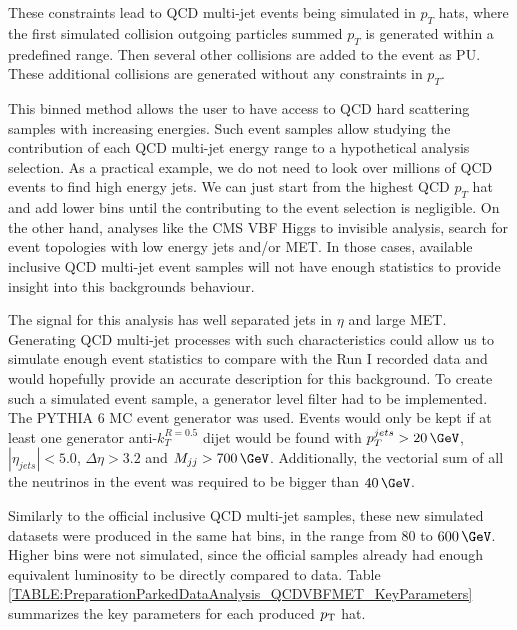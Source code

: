 These constraints lead to \gls{QCD} multi-jet events being simulated in $p_T$ hats, where the first simulated collision outgoing particles summed $p_T$ is generated within a predefined range. Then several other collisions are added to the event as \gls{PU}. These additional collisions are generated without any constraints in $p_T$. 

This binned method allows the user to have access to \gls{QCD} hard scattering samples with increasing energies. Such event samples allow studying the contribution of each \gls{QCD} multi-jet energy range to a hypothetical analysis selection. As a practical example, we do not need to look over millions of \gls{QCD} events to find high energy jets. We can just start from the highest \gls{QCD} $p_T$ hat and add lower bins until the contributing to the event selection is negligible. On the other hand, analyses like the \gls{CMS} \gls{VBF} Higgs to invisible analysis, search for event topologies with low energy jets and/or \gls{MET}. In those cases, available inclusive \gls{QCD} multi-jet event samples will not have enough statistics to provide insight into this backgrounds behaviour.

The signal for this analysis has well separated jets in $\eta$ and large \gls{MET}. Generating \gls{QCD} multi-jet processes with such characteristics could allow us to simulate enough event statistics to compare with the Run I recorded data and would hopefully provide an accurate description for this background. To create such a simulated event sample, a generator level filter had to be implemented. The \textsc{PYTHIA 6} \gls{MC} event generator was used. Events would only be kept if at least one generator anti-$k_T^{R=0.5}$ dijet would be found with $p_T^{jets}>20\,\GeV$, $|\eta_{jets}|<5.0$, $\Delta\eta>3.2$ and $M_{jj}>700\,\GeV$. Additionally, the vectorial sum of all the neutrinos in the event was required to be bigger than $40\,\GeV$. 

Similarly to the official inclusive \gls{QCD} multi-jet samples, these new simulated datasets were produced in the same \pt hat bins, in the range from 80 to $600\,\GeV$. Higher \pt bins were not simulated, since the official samples already had enough equivalent luminosity to be directly compared to data. Table \ref{TABLE:PreparationParkedDataAnalysis_QCDVBFMET_KeyParameters} summarizes the key parameters for each produced $p_{\mathrm{T}}$ hat.

